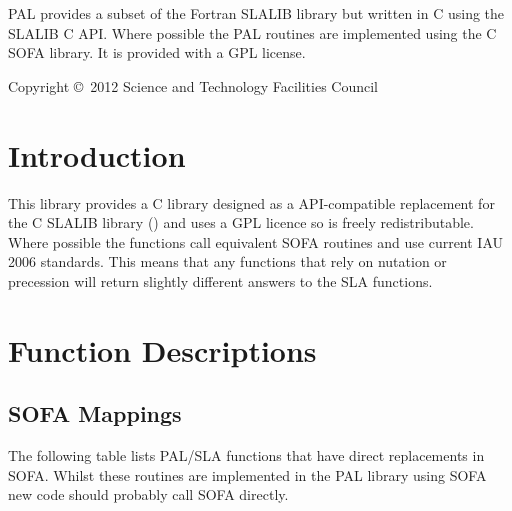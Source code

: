 \documentclass[twoside,11pt]{article}
\newcommand{\stardocinitials}  {SUN}
\newcommand{\stardoccopyright} 
{Copyright \copyright\ 2012 Science and Technology Facilities Council}
\newcommand{\stardocnumber}    {267.1}
\newcommand{\stardocabstract}  {
PAL provides a subset of the Fortran SLALIB library but written in C
using the SLALIB C API. Where possible the PAL routines are
implemented using the C SOFA library. It is provided with a GPL license.
}
\newcommand{\stardocname}{\stardocinitials /\stardocnumber}
\newenvironment{latexonly}{}{}
\renewcommand{\_}{\texttt{\symbol{95}}}
\renewcommand{\thepage}{\roman{page}}
\begin{document}
\stardocabstract

\begin{latexonly}
\newpage
\vspace*{\fill}
\stardoccopyright
\end{latexonly}


\cleardoublepage
\renewcommand{\thepage}{\arabic{page}}
\setcounter{page}{1}


\section{Introduction}

This library provides a C library designed as a API-compatible
replacement for the C SLALIB library () and uses a GPL licence so is
freely redistributable. Where possible the functions call equivalent
SOFA routines and use current IAU 2006 standards. This means that any
functions that rely on nutation or precession will return slightly
different answers to the SLA functions.

\clearpage
\appendix
\section{\label{APP:SPEC}Function Descriptions}

\subsection{SOFA Mappings}

The following table lists PAL/SLA functions that have direct
replacements in SOFA. Whilst these routines are implemented in the PAL
library using SOFA new code should probably call SOFA directly.
\end{document}

